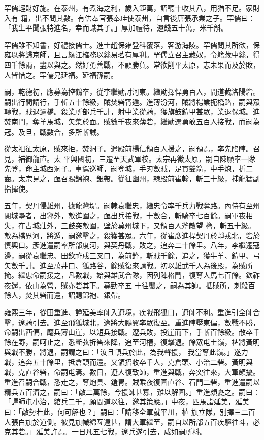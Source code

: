 \begin{pinyinscope}
 罕儒輕財好施。在泰州，有煮海之利，歲入鉅萬，詔聽十收其八，用猶不足。家財入有
 籍，出不問其數。有供奉官張奉珪使泰州，自言後唐張承業之子。罕儒曰：「我生平聞張特進名，幸而識其子。」厚加禮待，遺錢五十萬，米千斛。



 罕儒雖不知書，好禮接儒士。進士趙保雍登科覆落，客游海陵。罕儒問其所欲，保雍以將歸京師，且言緣江榷務以絲易茗有厚利。罕儒立召主藏奴，令籍藏中絲，得四千餘兩，盡以與之。然好勇善戰，不顧勝負。常欲削平太原，志未果而及於敗，人皆惜之。罕儒兄延福。延福孫嗣。



 嗣，乾德初，應募為控鶴卒，從李繼勛討河東。繼勛擇悍勇百人，間道截洛陽砦。嗣出行間請行，手斬五十餘級，賊焚砦宵遁。進薄汾河，賊將楊業扼橋路，嗣與眾轉戰，賊退逾橋。殺業所部兵千計，射中業從騎，獲旗鼓鎧甲甚眾，業退保城。進焚南門，奪羊馬城，矢集於面。賊數千夜來薄砦，繼勛選勇敢五百人接戰，而嗣為冠。及旦，戰數合，多所斬馘。



 從太祖征太原，賊來拒，焚洞子。遣殿前楊信領百人援之，嗣預焉，率先陷陣。召見，補御龍直。太
 平興國初，三遷至天武軍校。太宗再徵太原，嗣自陳願率一隊先登，命主城西洞子。車駕巡師，嗣登城，手刃數賊，足貫雙箭，中手炮，折二齒。太宗見之，亟召賜錦袍、銀帶。從征幽州，隸殿前崔翰，斬三十級，補龍猛副指揮使。



 五年，契丹侵雄州，據龍灣堤。嗣隸袁繼忠，繼忠令率千兵力戰奪路。內侍有至州閱城壘者，出郛外，敵進圍之，亟出兵接戰，十數合，斬騎卒七百餘。嗣軍夜相失，在古城莊外，三鼓突敵圍，壁於莫州城下，又領百人斧敵望
 櫓，斬五十級。敵為橋界河，將遁，嗣邀擊之，殺獲甚眾。六年，從崔彥進捍契丹於靜戎北，砦於慎興口。彥進遣嗣率所部度河，與契丹戰，敗之，追奔二十餘里。八年，李繼遷寇邊，嗣從袁繼忠、田欽祚戍三叉口，為前鋒，斬賊千餘，追之，獲牛羊、鎧甲、弓矢數千計。進至萬井口、狐路谷，餘賊復來請戰。初以雄武千人為後殿，為賊所掩。繼忠命嗣援之，凡數戰，始與雄武合隊，因列陣格鬥，復奪人馬七百餘。欽祚夜還，依山為營，賊亦砦其下。募勁卒五
 十往襲之，嗣為其帥。抵賊所，刺殺百餘人，焚其砦而還，詔賜錦袍、銀帶。



 雍熙三年，從田重進、譚延美率師入遼境，疾戰飛狐口，遼師不利。重進引全師合擊，遼騎引去。進至飛狐城北，遼將大鵬翼率眾復至。重進陣壓東偏，數戰不勝，命嗣出西偏，麾兵薄山崖，以短兵接戰。遼兵敗，投崖而下，手斬百餘級。散卒千餘在野，嗣呵止之，悉斷弦折筈來降，追至河槽，復擊退。餘眾屯土嶺，裨將黃明與戰不勝，將退，嗣謂之曰：「汝且頓兵於此，為我聲援，
 我當奪此嶺。」遂力戰，追奔五十餘里，抵倉頭而還。又領招收卒千人，克倉頭、小治二砦。黃明與戰，克直谷砦，命嗣屯焉。數日，遼人復致師，重進與戰，奔突往來，大軍頗擾。重進召嗣合戰，悉走之，奪炮具、鎧冑。賊乘夜復圍直谷、石門二砦，重進遣嗣以精兵五百濟之，嗣曰：「敵二萬餘，今援師甚寡，難以解圍。」重進頗憂之。嗣曰：「譚師屯小治，綰兵二千，願間道以往，邀其策應。」中夜，匹馬詣延美，延美曰：「敵勢若此，何可解也？」嗣曰：「請移全軍就平川，植
 旗立隊，別擇三二百人張白旗於道側。彼見旗幟綿亙遠甚，謂大軍繼至，嗣自以所部五百疾驅往斗，必克其砦。」延美許焉。一日凡五七戰，遼兵遂引去，咸如嗣所料。




\end{pinyinscope}
